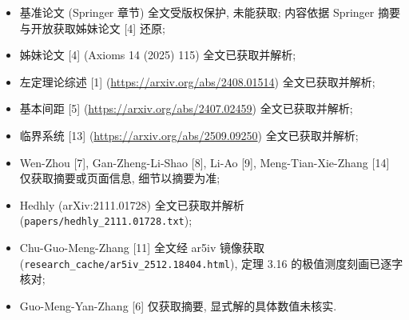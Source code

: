 \documentclass[UTF8]{ctexart}
\begin{document}
\begin{itemize}
	\item 基准论文 (Springer 章节) 全文受版权保护, 未能获取; 内容依据 Springer
		摘要与开放获取姊妹论文 [4] 还原;
	\item 姊妹论文 [4] (Axioms 14 (2025) 115) 全文已获取并解析;
\item 左定理论综述 [1] (\url{https://arxiv.org/abs/2408.01514}) 全文已获取并解析;
\item 基本间距 [5] (\url{https://arxiv.org/abs/2407.02459}) 全文已获取并解析;
\item 临界系统 [13] (\url{https://arxiv.org/abs/2509.09250}) 全文已获取并解析;
	\item Wen-Zhou [7], Gan-Zheng-Li-Shao [8], Li-Ao [9], Meng-Tian-Xie-Zhang [14] 仅获取摘要或页面信息, 细节以摘要为准;
	\item Hedhly (arXiv:2111.01728) 全文已获取并解析 (\texttt{papers/hedhly\_2111.01728.txt});
	\item Chu-Guo-Meng-Zhang [11] 全文经 ar5iv 镜像获取 (\texttt{research\_cache/ar5iv\_2512.18404.html}), 定理 3.16 的极值测度刻画已逐字核对;
	\item Guo-Meng-Yan-Zhang [6] 仅获取摘要, 显式解的具体数值未核实.
\end{itemize}
\end{document}
